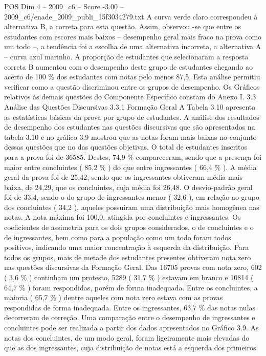 \begin{textsample}{POS Dim 4 – 2009\_c6 – Score -3.00 – 2009\_c6/enade\_2009\_publi\_15f3034279.txt}
A curva verde claro correspondeu à alternativa B, a correta para esta questão.
Assim, observou -se que entre os estudantes com escores mais baixos – desempenho geral mais fraco na prova como um todo –, a tendência foi a escolha de uma alternativa incorreta, a alternativa A – curva azul marinho.
A proporção de estudantes que selecionaram a resposta correta B aumentou com o desempenho deste grupo de estudantes chegando ao acerto de 100 \% dos estudantes com notas pelo menos 87,5.
Esta análise permitiu verificar como a questão discriminou entre os grupos de desempenho.
Os Gráficos relativos às demais questões do Componente Específico constam do Anexo I. 3.3 Análise das Questões Discursivas 3.3.1 Formação Geral A Tabela 3.10 apresenta as estatísticas básicas da prova por grupo de estudantes.
A análise dos resultados de desempenho dos estudantes nas questões discursivas que são apresentados na tabela 3.10 e no gráfico 3.9 mostrou que as notas foram mais baixas no conjunto dessas questões que no das questões objetivas.
O total de estudantes inscritos para a prova foi de 36585.
Destes, 74,9 \% compareceram, sendo que a presença foi maior entre concluintes ( 85,2 \% ) do que entre ingressantes ( 66,4 \% ).
A média geral da prova foi de 25,42, sendo que os ingressantes obtiveram média mais baixa, de 24,29, que os concluintes, cuja média foi 26,48.
O desvio-padrão geral foi de 33,4, sendo o do grupo de ingressantes menor ( 32,6 ), em relação ao grupo dos concluintes ( 34,2 ), aqueles possuíram uma distribuição mais homogênea nas notas.
A nota máxima foi 100,0, atingida por concluintes e ingressantes.
Os coeficientes de assimetria para os dois grupos considerados, o de concluintes e o de ingressantes, bem como para a população como um todo foram todos positivos, indicando uma maior concentração à esquerda da distribuição.
Para todos os grupos, mais de metade dos estudantes presentes obtiveram nota zero nas questões discursivas da Formação Geral.
Das 16705 provas com nota zero, 602 ( 3,6 \% ) continham um protesto, 5289 ( 31,7 \% ) estavam em branco e 10814 ( 64,7 \% ) foram respondidas, porém de forma inadequada.
Entre os concluintes, a maioria ( 65,7 \% ) dentre aqueles com nota zero estava com as provas respondidas de forma inadequada.
Entre os ingressantes, 63,7 \% das notas nulas decorreram de correção.
Uma comparação entre o desempenho de ingressantes e concluintes pode ser realizada a partir dos dados apresentados no Gráfico 3.9.
As notas dos concluintes, de um modo geral, foram ligeiramente mais elevadas do que as dos ingressantes, cuja distribuição de notas está a esquerda dos primeiros.

\end{textsample}
